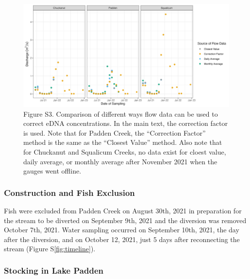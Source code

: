 \documentclass[
]{article}
\begin{document}
\begin{figure}
\centering
\includegraphics{../Output/SupplementalFigures/flow_by_source.png}
\caption{Figure S3. Comparison of different ways flow data can be used
to correct eDNA concentrations. In the main text, the correction factor
is used. Note that for Padden Creek, the ``Correction Factor'' method is
the same as the ``Closest Value'' method. Also note that for Chuckanut
and Squalicum Creeks, no data exist for cloest value, daily average, or
monthly average after November 2021 when the gauges went
offline.\label{fig:dischargemethod}}
\end{figure}

\hypertarget{construction-and-fish-exclusion}{%
\subsubsection{Construction and Fish
Exclusion}\label{construction-and-fish-exclusion}}

Fish were excluded from Padden Creek on August 30th, 2021 in preparation
for the stream to be diverted on September 9th, 2021 and the diversion
was removed October 7th, 2021. Water sampling occurred on September
10th, 2021, the day after the diversion, and on October 12, 2021, just 5
days after reconnecting the stream (Figure S\ref{fig:timeline}).

\hypertarget{stocking-in-lake-padden}{%
\subsubsection{Stocking in Lake Padden}\label{stocking-in-lake-padden}}
\end{document}
